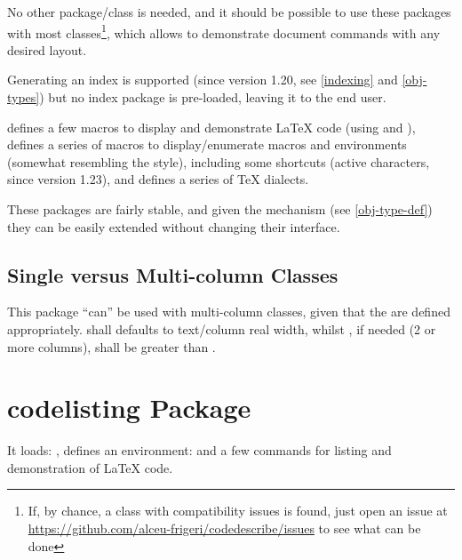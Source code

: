 \documentclass{article}
\begin{document}
No other package/class is needed, and it should be possible to use these packages with most classes\footnote{If, by chance, a class with compatibility issues is found, just open an issue at {\url{https://github.com/alceu-frigeri/codedescribe/issues}} to see what can be done}, which allows to demonstrate document commands with any desired layout.

Generating an index is supported (since version 1.20, see \ref{indexing} and \ref{obj-types}) but no index package is pre-loaded, leaving it to the end user.

 defines a few macros to display and demonstrate \LaTeX{} code (using  and ),  defines a series of macros to display/enumerate macros and environments (somewhat resembling the  style), including some shortcuts (active characters, since version 1.23), and  defines a series of  \TeX{} dialects.

These packages are fairly stable, and given the  mechanism (see \ref{obj-type-def}) they can be easily extended without changing their interface.

\subsection{Single versus Multi-column Classes}
This package ``can'' be used with multi-column classes, given that the  are defined appropriately.  shall defaults to text/column real width, whilst , if needed (2 or more columns), shall be greater than \tsobj[code,no index,sep = plus]{\marginparwidth,\marginparsep}.

\newpage
\section{codelisting Package}

It loads: ,  defines an environment:  and a few commands for listing and demonstration of \LaTeX{} code.
\end{document}
